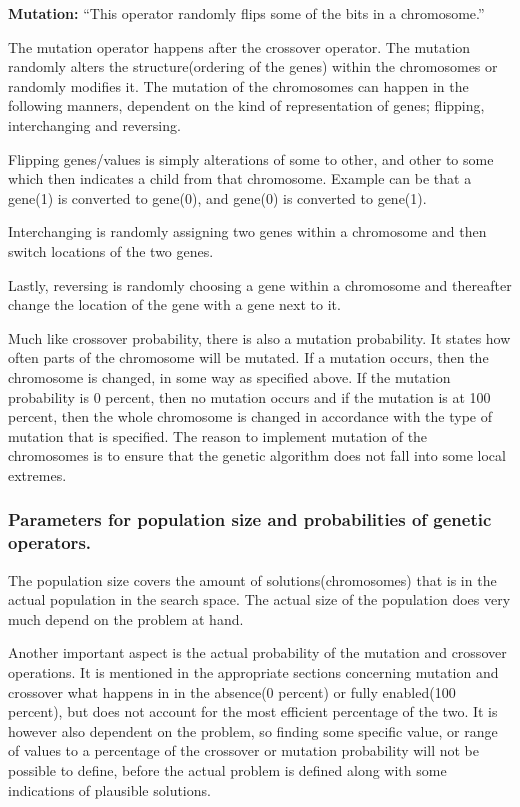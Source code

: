 \textbf{Mutation:} \enquote{This operator randomly flips some of the bits in a chromosome.} \cite[pp. 8]{Melanie1990}

The mutation operator happens after the crossover operator. The mutation randomly alters the structure(ordering of the genes) within the chromosomes or randomly modifies it.
The mutation of the chromosomes can happen in the following manners, dependent on the kind of representation of genes; flipping, interchanging and reversing.\cite[pp. 57]{Sivanandam2008}

Flipping genes/values is simply alterations of some to other, and other to some which then indicates a child from that chromosome. Example can be that a gene(1) is converted to gene(0), and gene(0) is converted to gene(1).

Interchanging is randomly assigning two genes within a chromosome and then switch locations of the two genes.

Lastly, reversing is randomly choosing a gene within a chromosome and thereafter change the location of the gene with a gene next to it.

Much like crossover probability, there is also a mutation probability. It states how often parts of the chromosome will be mutated. If a mutation occurs, then the chromosome is changed, in some way as specified above. If the mutation probability is 0 percent, then no mutation occurs and if the mutation is at 100 percent, then the whole chromosome is changed in accordance with the type of mutation that is specified. The reason to implement mutation of the chromosomes is to ensure that the genetic algorithm does not fall into some local extremes.\cite[pp. 57]{Sivanandam2008}

\subsubsection{Parameters for population size and probabilities of genetic operators.}


The population size covers the amount of solutions(chromosomes) that is in the actual population in the search space. The actual size of the population does very much depend on the problem at hand.\cite[pp. 42]{Sivanandam2008}


Another important aspect is the actual probability of the mutation and crossover operations.
It is mentioned in the appropriate sections concerning mutation and crossover what happens in in the absence(0 percent) or fully enabled(100 percent), but does not account for the most efficient percentage of the two. It is however also dependent on the problem, so finding some specific value, or range of values to a percentage of the crossover or mutation probability will not be possible to define, before the actual problem is defined along with some indications of plausible solutions.

